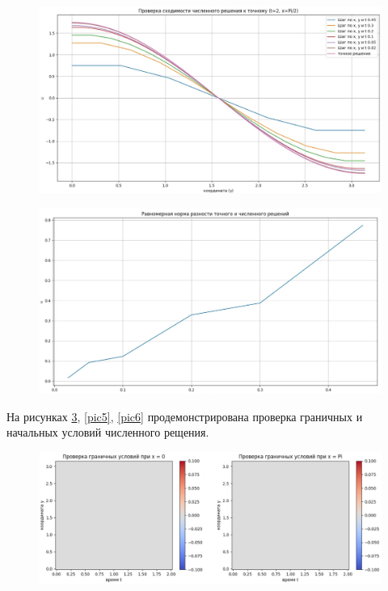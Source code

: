 \documentclass[a4paper,14pt]{article}
\begin{document}
\begin{figure}[h!]
\centering
\includegraphics[scale=0.4]{проверка 1.jpg}
\caption{\label{pic2}}
\end{figure} 

\begin{figure}[h!]
\centering
\includegraphics[scale=0.4]{проверка 2.jpg}
\caption{\label{pic3}}
\end{figure} 

На рисунках \ref{pic4}, \ref{pic5}, \ref{pic6} продемонстрирована проверка граничных и начальных условий численного рещения.

\begin{figure}[h!]
\centering
\includegraphics[scale=0.3]{гу x.jpg}
\caption{\label{pic4}}
\end{figure} 
\end{document}
